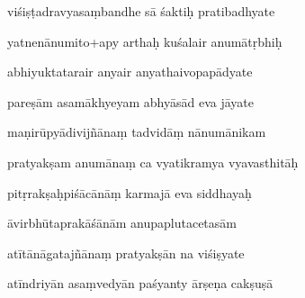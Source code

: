 \documentclass[article,12pt,a4paper]{memoir}%
\newcounter{parCount}
\begin{document}
	  
	  \pstart \leavevmode%
	viśiṣṭadravyasaṃbandhe sā śaktiḥ pratibadhyate 
	{}
	\pend%
      

	  
	  \pstart {} yatnenānumito+apy arthaḥ kuśalair anumātṛbhiḥ 
	{}
	\pend%
      

	  
	  \pstart \leavevmode%
	abhiyuktatarair anyair anyathaivopapādyate 
	{}
	\pend%
      

	  
	  \pstart {} pareṣām asamākhyeyam abhyāsād eva jāyate 
	{}
	\pend%
      

	  
	  \pstart \leavevmode%
	maṇirūpyādivijñānaṃ tadvidāṃ nānumānikam 
	{}
	\pend%
      

	  
	  \pstart {} pratyakṣam anumānaṃ ca vyatikramya vyavasthitāḥ 
	{}
	\pend%
      

	  
	  \pstart \leavevmode%
	pitṛrakṣaḥpiśācānāṃ karmajā eva siddhayaḥ 
	{}
	\pend%
      

	  
	  \pstart {} āvirbhūtaprakāśānām anupaplutacetasām 
	{}
	\pend%
      

	  
	  \pstart \leavevmode%
	atītānāgatajñānaṃ pratyakṣān na viśiṣyate 
	{}
	\pend%
      

	  
	  \pstart {} atīndriyān asaṃvedyān paśyanty ārṣeṇa cakṣuṣā 
	{}
	\pend%
      
\end{document}
